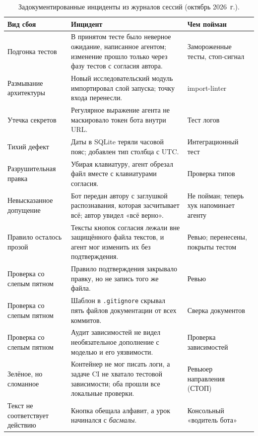 \begin{table}[ht]
\centering\small
\caption{Задокументированные инциденты из журналов сессий (октябрь 2026~г.).}
\label{tab:incidents}
\begin{tabularx}{\linewidth}{@{}P{3.0cm}LP{3.2cm}@{}}
\toprule
Вид сбоя & Инцидент & Чем пойман \\
\midrule
Подгонка тестов & В принятом тесте было неверное ожидание, написанное агентом; изменение прошло только
через фазу тестов с согласия автора. & Замороженные тесты, стоп-сигнал \\
Размывание архитектуры & Новый исследовательский модуль импортировал слой запуска; точку входа
перенесли. & import-linter \\
Утечка секретов & Регулярное выражение агента не маскировало токен бота внутри URL. & Тест логов \\
Тихий дефект & Даты в SQLite теряли часовой пояс; добавлен тип столбца с UTC. & Интеграционный тест \\
Разрушительная правка & Убирая клавиатуру, агент обрезал файл вместе с клавиатурами согласия. & Проверка
типов \\
Невысказанное допущение & Бот передан автору с заглушкой распознавания, которая засчитывает всё; автор
увидел «всё верно». & Не пойман; теперь хук напоминает агенту \\
Правило осталось прозой & Тексты кнопок согласия лежали вне защищённого файла текстов, и агент мог
изменить их без подтверждения. & Ревью; перенесены, покрыты тестом \\
Проверка со слепым пятном & Правило подтверждения закрывало правку, но не запись того же файла. & Ревью \\
Проверка со слепым пятном & Шаблон в \texttt{.gitignore} скрывал пять файлов документации от всех
коммитов. & Сверка документов \\
Проверка со слепым пятном & Аудит зависимостей не видел необязательное дополнение с моделью и его
уязвимости. & Проверка зависимостей \\
Зелёное, но сломанное & Контейнер не мог писать логи, а задаче CI не хватало тестовой зависимости; оба
прошли все локальные проверки. & Ревьюер направления (СТОП) \\
Текст не соответствует действию & Кнопка обещала алфавит, а урок начинался с \emph{басмалы}. & Консольный
«водитель бота» \\
\bottomrule
\end{tabularx}
\end{table}


